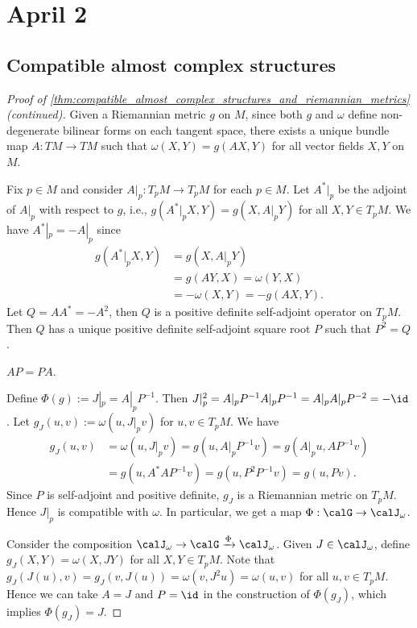 \section{April 2}


\subsection{Compatible almost complex structures}

  \begin{proof}[Proof of \cref{thm:compatible_almost_complex_structures_and_riemannian_metrics} (continued)]
    Given a Riemannian metric $g$ on $M$, since both $g$ and $\omega$ define non-degenerate bilinear forms on each tangent space, there exists a unique bundle map $A: TM \to TM$ such that $\omega(X, Y) = g(AX, Y)$ for all vector fields $X, Y$ on $M$.

    Fix $p \in M$ and consider $A|_p: T_p M \to T_p M$ for each $p \in M$.
    Let $A^*|_p$ be the adjoint of $A|_p$ with respect to $g$, i.e., $g(A^*|_p X, Y) = g(X, A|_p Y)$ for all $X, Y \in T_p M$.
    We have $A^*|_p = -A|_p$ since 
    \begin{align*}
      g(A^*|_p X, Y) & = g(X, A|_p Y) \\
        & = g(AY, X) = \omega(Y, X) \\
        & = -\omega(X, Y) = -g(AX, Y).
    \end{align*}
    Let $Q = A A^* = -A^2$, then $Q$ is a positive definite self-adjoint operator on $T_p M$.
    Then $Q$ has a unique positive definite self-adjoint square root $P$ such that $P^2 = Q$.

    \begin{claim}\label{claim:AP_PA_in_the_proof_of_compatible_almost_complex_structures_and_riemannian_metrics}
      $AP = PA$.
    \end{claim}

    Define $\Phi(g) := J|_p = A|_pP^{-1} $.
    Then $J|_p^2 = A|_p P^{-1} A|_p P^{-1} = A|_p A|_p P^{-2} = -\id$.
    Let $g_J(u,v) := \omega(u, J|_p v)$ for $u, v \in T_p M$.
    We have 
    \begin{align*}
      g_J(u, v) & = \omega(u, J|_p v) = g(u, A|_p P^{-1} v) = g(A|_p u, AP^{-1} v) \\
        & = g(u, A^* A P^{-1} v) = g(u, P^2 P^{-1} v) = g(u, Pv).
    \end{align*}
    Since $P$ is self-adjoint and positive definite, $g_J$ is a Riemannian metric on $T_p M$.
    Hence $J|_p$ is compatible with $\omega$.
    In particular, we get a map $\Phi: \calG \to \calJ_\omega$.

    Consider the composition $\calJ_\omega \to \calG \xrightarrow{\Phi} \calJ_\omega$.
    Given $J \in \calJ_\omega$, define $g_J(X, Y) = \omega(X, JY)$ for all $X, Y \in T_p M$.
    Note that $g_J(J(u),v) = g_J(v, J(u)) = \omega(v, J^2 u) = \omega(u, v)$ for all $u, v \in T_p M$.
    Hence we can take $A = J$ and $P = \id$ in the construction of $\Phi(g_J)$, which implies $\Phi(g_J) = J$.
  \end{proof}

